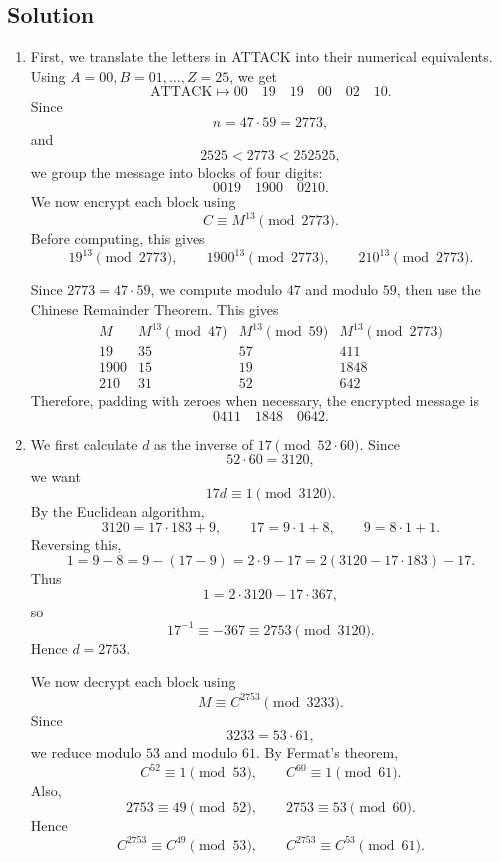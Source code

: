 \documentclass{article}
\begin{document}
\subsection*{Solution}
    \begin{enumerate}
        \item First, we translate the letters in ATTACK into their numerical equivalents. Using $A = 00, B = 01, \dots, Z = 25$, we get
        $$\text{ATTACK} \mapsto 00 \quad 19 \quad 19 \quad 00 \quad 02 \quad 10.$$
        Since
        $$n = 47 \cdot 59 = 2773,$$
        and
        $$2525 < 2773 < 252525,$$
        we group the message into blocks of four digits:
        $$0019 \quad 1900 \quad 0210.$$
        We now encrypt each block using
        $$C \equiv M^{13} \pmod{2773}.$$
        Before computing, this gives
        $$19^{13} \pmod{2773}, \qquad 1900^{13} \pmod{2773}, \qquad 210^{13} \pmod{2773}.$$

        Since $2773 = 47 \cdot 59$, we compute modulo $47$ and modulo $59$, then use the Chinese Remainder Theorem. This gives
        $$
        \begin{array}{c|c|c|c}
            M & M^{13} \pmod{47} & M^{13} \pmod{59} & M^{13} \pmod{2773} \\ \hline
            19 & 35 & 57 & 411 \\
            1900 & 15 & 19 & 1848 \\
            210 & 31 & 52 & 642
        \end{array}
        $$
        Therefore, padding with zeroes when necessary, the encrypted message is
        $$\boxed{0411 \quad 1848 \quad 0642}.$$

        \item We first calculate $d$ as the inverse of $17 \pmod{52 \cdot 60}$. Since
        $$52 \cdot 60 = 3120,$$
        we want
        $$17d \equiv 1 \pmod{3120}.$$
        By the Euclidean algorithm,
        $$3120 = 17 \cdot 183 + 9, \qquad 17 = 9 \cdot 1 + 8, \qquad 9 = 8 \cdot 1 + 1.$$
        Reversing this,
        $$1 = 9 - 8 = 9 - (17 - 9) = 2 \cdot 9 - 17 = 2(3120 - 17 \cdot 183) - 17.$$
        Thus
        $$1 = 2 \cdot 3120 - 17 \cdot 367,$$
        so
        $$17^{-1} \equiv -367 \equiv 2753 \pmod{3120}.$$
        Hence $d = 2753$.

        We now decrypt each block using
        $$M \equiv C^{2753} \pmod{3233}.$$
        Since
        $$3233 = 53 \cdot 61,$$
        we reduce modulo $53$ and modulo $61$. By Fermat's theorem,
        $$C^{52} \equiv 1 \pmod{53}, \qquad C^{60} \equiv 1 \pmod{61}.$$
        Also,
        $$2753 \equiv 49 \pmod{52}, \qquad 2753 \equiv 53 \pmod{60}.$$
        Hence
        $$C^{2753} \equiv C^{49} \pmod{53}, \qquad C^{2753} \equiv C^{53} \pmod{61}.$$


\end{enumerate}
\end{document}
